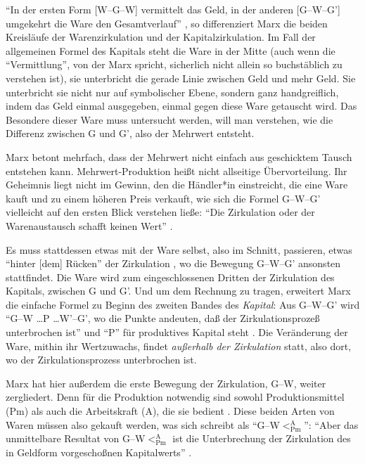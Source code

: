 \documentclass[12pt,
               paper=a4,
               twoside=false,
               onehalfspacing,
               bibliography=totoc,
               toc=graduated,
               ]{scrartcl}
\newcommand{\pc}[2]{\parencite[#1]{#2}}
\newcommand{\vgl}[2]{\parencite[vgl.][#1]{#2}}
\newcommand{\gwg}{G--W--G'\xspace}
\newcommand{\gwapm}{G--W$<^{\text{A}}_{\text{Pm}}$\xspace}
\begin{document}

"`In der ersten Form [W--G--W] vermittelt das Geld, in der anderen
[G--W--G'] umgekehrt die Ware den Gesamtverlauf"' \pc{163}{kap}, so
differenziert Marx die beiden Kreisläufe der Warenzirkulation und der
Kapitalzirkulation. Im Fall der allgemeinen Formel des Kapitals steht
die Ware in der Mitte (auch wenn die "`Vermittlung"', von der Marx
spricht, sicherlich nicht allein so buchstäblich zu verstehen ist), sie
unterbricht die gerade Linie zwischen Geld und mehr Geld. Sie
unterbricht sie nicht nur auf symbolischer Ebene, sondern ganz
handgreiflich, indem das Geld einmal ausgegeben, einmal gegen diese
Ware getauscht wird. Das Besondere dieser Ware muss untersucht werden,
will man verstehen, wie die Differenz zwischen G und G', also der
Mehrwert entsteht.


Marx betont mehrfach, dass der Mehrwert nicht einfach aus geschicktem
Tausch entstehen kann. Mehrwert-Produktion heißt nicht allseitige
Übervorteilung. Ihr Geheimnis liegt nicht im Gewinn, den die Händler*in
einstreicht, die eine Ware kauft und zu einem höheren Preis verkauft,
wie sich die Formel \gwg vielleicht auf den ersten Blick verstehen
ließe: "`Die Zirkulation oder der Warenaustausch schafft keinen Wert"'
\pc{178}{kap}.


Es muss stattdessen etwas mit der Ware selbst, also im Schnitt,
passieren, etwas "`hinter [dem] Rücken"' der Zirkulation
\pc{181}{kap}, wo die Bewegung \gwg ansonsten stattfindet. Die Ware
wird zum eingeschlossenen Dritten der Zirkulation des Kapitals,
zwischen G und G'. Und um dem Rechnung zu tragen, erweitert Marx die
einfache Formel zu Beginn des zweiten Bandes des \emph{Kapital}: Aus
\gwg wird "`G--W \dots P \dots W'--G', wo die Punkte andeuten, daß der
Zirkulationsprozeß unterbrochen ist"' \pc{31}{kap2} und "`P"' für
produktives Kapital steht \vgl{34}{kap2}. Die Veränderung der Ware,
mithin ihr Wertzuwachs, findet \emph{außerhalb der Zirkulation} statt,
also dort, wo der Zirkulationsprozess unterbrochen ist.


Marx hat hier außerdem die erste Bewegung der Zirkulation, G--W,
weiter zergliedert. Denn für die Produktion notwendig sind sowohl
Produktionsmittel (Pm) als auch die Arbeitskraft (A), die sie bedient
\vgl{32}{kap2}. Diese beiden Arten von Waren müssen also gekauft
werden, was sich schreibt als "`G--W$<^{\text{A}}_{\text{Pm}}$"':
"`Aber das unmittelbare Resultat von \gwapm ist die Unterbrechung der
Zirkulation des in Geldform vorgeschoßnen Kapitalwerts"'
\pc{40}{kap2}.
\end{document}
